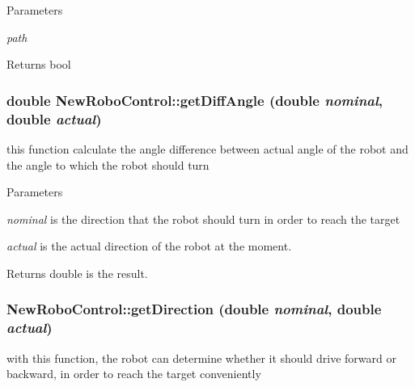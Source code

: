 \begin{DoxyParams}{Parameters}
\item[{\em path}]\end{DoxyParams}
\begin{DoxyReturn}{Returns}
bool 
\end{DoxyReturn}
\hypertarget{classNewRoboControl_a960c714f4f8828d16dc955c871affbb5}{
\subsubsection[{getDiffAngle}]{\setlength{\rightskip}{0pt plus 5cm}double NewRoboControl::getDiffAngle (double {\em nominal}, \/  double {\em actual})}}
\label{classNewRoboControl_a960c714f4f8828d16dc955c871affbb5}


this function calculate the angle difference between actual angle of the robot and the angle to which the robot should turn 


\begin{DoxyParams}{Parameters}
\item[{\em nominal}]is the direction that the robot should turn in order to reach the target \item[{\em actual}]is the actual direction of the robot at the moment. \end{DoxyParams}
\begin{DoxyReturn}{Returns}
double is the result. 
\end{DoxyReturn}
\hypertarget{classNewRoboControl_a9979ccfbc622d9082fb034caf36c514b}{
\subsubsection[{getDirection}]{ NewRoboControl::getDirection (double {\em nominal}, \/  double {\em actual})}}
\label{classNewRoboControl_a9979ccfbc622d9082fb034caf36c514b}


with this function, the robot can determine whether it should drive forward or backward, in order to reach the target conveniently 


